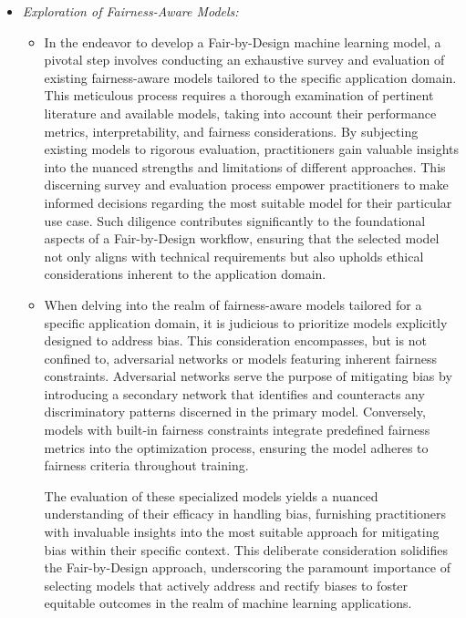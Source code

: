 \begin{itemize}

    \item \emph{Exploration of Fairness-Aware Models:}
     
    \begin{itemize}
    
        \item In the endeavor to develop a Fair-by-Design machine learning model, a pivotal step involves conducting an exhaustive survey and evaluation of existing fairness-aware models tailored to the specific application domain. This meticulous process requires a thorough examination of pertinent literature and available models, taking into account their performance metrics, interpretability, and fairness considerations. By subjecting existing models to rigorous evaluation, practitioners gain valuable insights into the nuanced strengths and limitations of different approaches. This discerning survey and evaluation process empower practitioners to make informed decisions regarding the most suitable model for their particular use case. Such diligence contributes significantly to the foundational aspects of a Fair-by-Design workflow, ensuring that the selected model not only aligns with technical requirements but also upholds ethical considerations inherent to the application domain.
    
        \item When delving into the realm of fairness-aware models tailored for a specific application domain, it is judicious to prioritize models explicitly designed to address bias. This consideration encompasses, but is not confined to, adversarial networks or models featuring inherent fairness constraints. Adversarial networks serve the purpose of mitigating bias by introducing a secondary network that identifies and counteracts any discriminatory patterns discerned in the primary model. Conversely, models with built-in fairness constraints integrate predefined fairness metrics into the optimization process, ensuring the model adheres to fairness criteria throughout training.

        The evaluation of these specialized models yields a nuanced understanding of their efficacy in handling bias, furnishing practitioners with invaluable insights into the most suitable approach for mitigating bias within their specific context. This deliberate consideration solidifies the Fair-by-Design approach, underscoring the paramount importance of selecting models that actively address and rectify biases to foster equitable outcomes in the realm of machine learning applications.    
    

\end{itemize}
\end{itemize}
